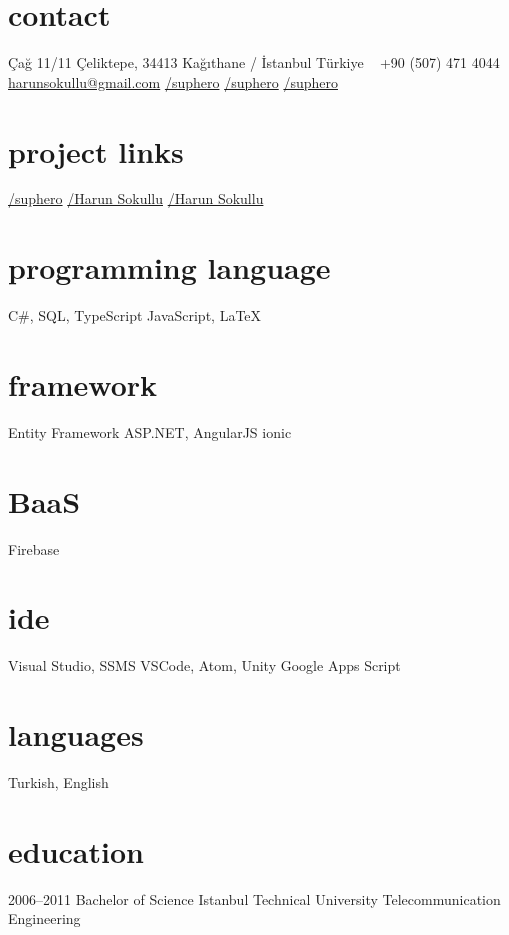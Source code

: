 \documentclass[]{../friggeri-cv} %
\begin{document}

\begin{aside}
\section{contact}
Çağ 11/11
Çeliktepe, 34413
Kağıthane / İstanbul
Türkiye
~
+90 (507) 471 4044
~
\href{mailto:harunsokullu@gmail.com}{harunsokullu@gmail.com}
\href{https://www.linkedin.com/in/suphero}{\faLinkedin/suphero}
\href{https://www.facebook.com/suphero}{\faFacebook/suphero}
\href{https://twitter.com/suphero}{\faTwitter/suphero}
\section{project links}
\href{https://github.com/suphero}{\faGithub/suphero}
\href{https://play.google.com/store/apps/developer?id=Harun+Sokullu}{\faAndroid/Harun Sokullu}
\href{https://itunes.apple.com/tr/developer/harun-sokullu/id1265151811}{\faApple/Harun Sokullu}
\section{programming language}
C\#, SQL, TypeScript
JavaScript, \LaTeX
\section{framework}
Entity Framework
ASP.NET, AngularJS
ionic
\section{BaaS}
Firebase
\section{ide}
Visual Studio, SSMS 
VSCode, Atom, Unity
Google Apps Script
\section{languages}
Turkish, English
\end{aside}
\section{education}

\begin{entrylist}

\entry
{2006--2011}
{Bachelor {\normalfont of Science}}
{Istanbul Technical University}
{Telecommunication Engineering}

\end{entrylist}
\end{document}
